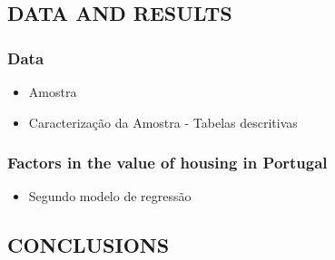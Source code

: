 \documentclass{aip-cp}
\begin{document}
\subsection{\uppercase{Data and Results}}
\subsubsection{Data}

\begin{itemize}
    \item Amostra
    \item Caracterização da Amostra - Tabelas descritivas 
\end{itemize}







\subsubsection{Factors in
the value of housing in Portugal}

\begin{itemize}
    \item Segundo modelo de regressão
\end{itemize}



\subsection{\uppercase{Conclusions}}
\end{document}
